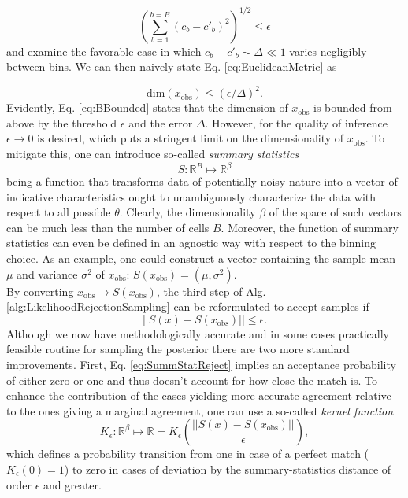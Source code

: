 \documentclass[%
 reprint,
 amsmath,amssymb,
 aps,
]{revtex4-2}
\begin{document}
\begin{equation} \label{eq:EuclideanMetric}
    \left( \sum_{b=1}^{b=B} \left(c_b - c'_b\right)^2 \right)^{1/2} \leq \epsilon
\end{equation}
and examine the favorable case in which $c_b - c'_b \sim \Delta \ll 1$ varies negligibly between bins. We can then naively state Eq. \eqref{eq:EuclideanMetric} as

\begin{equation} \label{eq:BBounded}
    \text{dim}(x_{\text{obs}}) \leq \left( \epsilon/\Delta \right)^2 .
\end{equation}
Evidently, Eq. \eqref{eq:BBounded} states that the dimension of $x_{\text{obs}}$ is bounded from above by the threshold $\epsilon$ and the error $\Delta$. However, for the quality of inference $\epsilon \to 0$ is desired, which puts a stringent limit on the dimensionality of $x_{\text{obs}}$. To mitigate this, one can introduce so-called \textit{summary statistics}
\begin{equation} \label{eq:SummStat}
    S : \mathbb{R}^B \mapsto \mathbb{R}^{\beta}
\end{equation}
being a function that transforms data of potentially noisy nature into a vector of indicative characteristics ought to unambiguously characterize the data with respect to all possible $\theta$. Clearly, the dimensionality $\beta$ of the space of such vectors can be much less than the number of cells $B$. Moreover, the function of summary statistics can even be defined in an agnostic way with respect to the binning choice. As an example, one could construct a vector containing the sample mean $\mu$ and variance $\sigma^2$ of $x_{\text{obs}}$: $S(x_{\text{obs}}) = \left(\mu, \sigma^2 \right)$. \\

By converting $x_{\text{obs}} \to S(x_{\text{obs}})$, the third step of Alg. \ref{alg:LikelihoodRejectionSampling} can be reformulated to accept samples if
\begin{equation} \label{eq:SummStatReject}
    ||S(x) - S(x_{\text{obs}})|| \leq \epsilon.
\end{equation}
Although we now have methodologically accurate and in some cases practically feasible routine for sampling the posterior there are two more standard improvements. First, Eq. \eqref{eq:SummStatReject} implies an acceptance probability of either zero or one and thus doesn't account for how close the match is. To enhance the contribution of the cases yielding more accurate agreement relative to the ones giving a marginal agreement, one can use a so-called \textit{kernel function}
\begin{equation} \label{eq:kernel}
    K_{\epsilon} : \mathbb{R}^{\beta} \mapsto \mathbb{R} = K_{\epsilon} \left( \frac{ || S(x) - S(x_{\text{obs}}) ||}{\epsilon} \right),
\end{equation}
which defines a probability transition from one in case of a perfect match ($K_{\epsilon}(0) = 1$) to zero in cases of deviation by the summary-statistics distance of order $\epsilon$ and greater. \\
\end{document}
